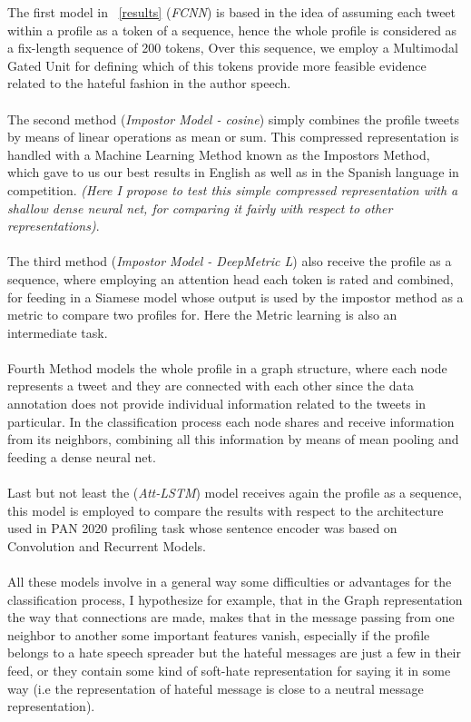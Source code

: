 \documentclass{llncs}
\begin{document}
	The first model in \tablename~\ref{results} (\textit{FCNN}) is based in the idea of assuming each tweet within a profile as a token of a sequence, hence the whole profile is considered as a fix-length sequence of 200 tokens, Over this sequence, we employ a Multimodal Gated Unit for defining which of this tokens provide more feasible evidence related to the hateful fashion in the author speech. \\\\	
	The second method (\textit{Impostor Model - cosine}) simply combines the profile tweets by means of linear operations as mean or sum. This compressed representation is handled with a Machine Learning Method known as the Impostors Method, which gave to us our best results in English as well as in the Spanish language in competition.  \textit{(Here I propose to test this simple compressed representation with a shallow dense neural net, for comparing it fairly with respect to other representations)}.\\\\
	The third method (\textit{Impostor Model - DeepMetric L}) also receive the profile as a sequence, where employing an attention head each token is rated and combined, for feeding in a Siamese model whose output is used by the impostor method as a metric to compare two profiles for. Here the Metric learning is also an intermediate task.\\\\	
	Fourth Method models the whole profile in a graph structure, where each node represents a tweet and they are connected with each other since the data annotation does not provide individual information related to the tweets in particular. In the classification process each node shares and receive information from its neighbors, combining all this information by means of mean pooling and feeding a dense neural net.\\\\
	Last but not least the (\textit{Att-LSTM}) model receives again the profile as a sequence, this model is employed to compare the results with respect to the architecture used in PAN 2020 profiling task whose sentence encoder was based on Convolution and Recurrent Models.\\\\
	All these models involve in a general way some difficulties or advantages for the classification process, I hypothesize for example, that in the Graph representation the way that connections are made, makes that in the message passing from one neighbor to another some important features vanish, especially if the profile belongs to a hate speech spreader but the hateful messages are just a few in their feed, or they contain some kind of soft-hate representation for saying it in some way (i.e the representation of hateful message is close to a neutral message representation).\\\\
\end{document}
